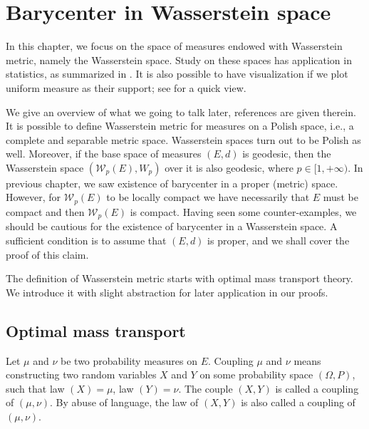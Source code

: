 \chapter{Barycenter in Wasserstein space}

In this chapter,
we focus on the space of measures endowed with Wasserstein metric, namely the Wasserstein space.
Study on these spaces has application in statistics,
as summarized in \cite{le2017existence}.
It is also possible to have visualization if we plot uniform measure as their support;
see  for a quick view.

We give an overview of what we going to talk later,
references are given therein.
It is possible to define Wasserstein metric for measures on a Polish space,
i.e., a complete and separable metric space.
Wasserstein spaces turn out to be Polish as well.
Moreover, if the base space of measures $(E,d)$ is geodesic,
then the Wasserstein space $(\mathcal{W}_p(E), W_p)$ over it is also geodesic, where $p \in [1, + \infty)$.
In previous chapter, we saw existence of barycenter in a proper (metric) space.
However, for $\mathcal{W}_p(E)$ to be locally compact we have necessarily that
$E$ must be compact and then $\mathcal{W}_p(E)$ is compact.
Having seen some counter-examples,
we should be cautious for the existence of barycenter in a Wasserstein space.
A sufficient condition is to assume that $(E,d)$ is proper,
and we shall cover the proof of this claim.

The definition of Wasserstein metric starts with optimal mass transport theory.
We introduce it with slight abstraction for later application in our proofs.

\section{Optimal mass transport}

\begin{defn}[Coupling]
	Let \(  \mu \) and \(  \nu  \) be two probability measures on $E$.
	Coupling \( \mu \) and \( \nu \) means constructing two random variables \( X \) and \( Y \) on some probability space \( ( \Omega , P )\),
	such that law \( ( X ) = \mu \), law \( ( Y ) = \nu .
	\) The couple \( ( X , Y ) \) is called a coupling of \( ( \mu , \nu ) .
	\) By abuse of language,
	the law of \( ( X , Y ) \) is also called a coupling of \( ( \mu , \nu ) \).
\end{defn}

